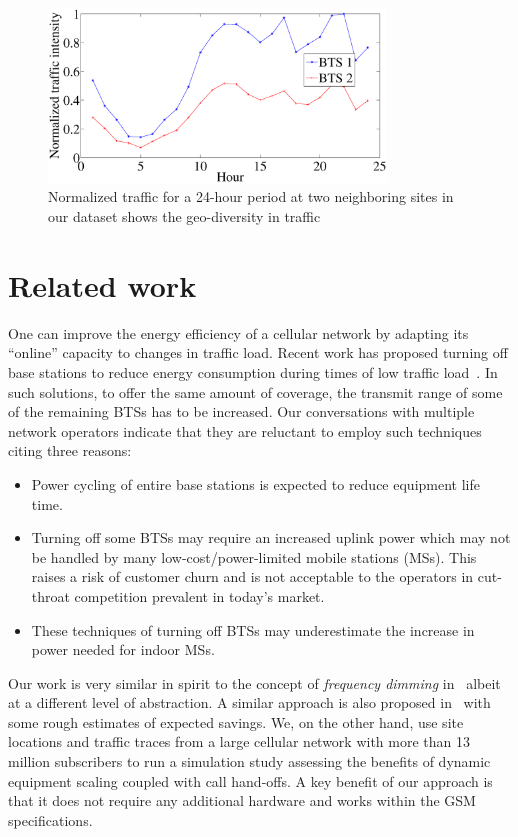 \begin{figure}
\centering
{\includegraphics[width=0.8\textwidth]{pics/traffic.eps}
\caption{Normalized traffic for a 24-hour period at two neighboring sites in our dataset shows the geo-diversity in traffic}
\label{fig:traffic}
}
\end{figure}

\section{Related work}
\label{sec:case2:related}
One can improve the energy efficiency of a cellular network by
adapting its ``online'' capacity to changes in traffic load.
Recent work has proposed turning off base stations to reduce
energy consumption during times of low traffic
load~\cite{Louhi:2007:BTSPower:INTELEC,Oh:Comm:2011,Peng:2011:BTSSaving:Mobicom,He:CellularPower:JN:2012}.
In such solutions, to offer the same amount of coverage, the transmit range of some of the remaining BTSs has to be increased. Our conversations with multiple network operators
indicate that they are reluctant to employ such techniques
citing three reasons:
\begin{itemize}
\item Power cycling of entire base stations is expected to
    reduce equipment life time.
\item Turning off some BTSs may require an increased uplink
    power which may not be handled by many low-cost/power-limited mobile
    stations (MSs). This raises a risk of customer churn and is
    not acceptable to the operators in cut-throat
    competition prevalent in today's market.
\item These techniques of turning off BTSs may
    underestimate the increase in power needed for indoor
    MSs.
\end{itemize}

Our work is very similar in spirit to the concept of
\textit{frequency dimming}
in~\cite{Tipper:Dimming:Globecom:2010} albeit at a different
level of abstraction. A similar approach is also proposed
in~\cite{Blume:2010:BLTJ:CellularPower} with some rough
estimates of expected savings. We, on the other hand, use site
locations and traffic traces from a large cellular network with
more than 13 million subscribers to run a simulation study
assessing the benefits of dynamic equipment scaling coupled
with call hand-offs.
A key benefit of our approach is that it 
does not require any additional hardware
and works within the GSM specifications.

